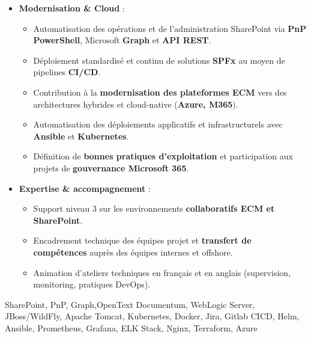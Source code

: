 \begin{experiences}
{\begin{itemize}[left=0pt,label={},itemsep=0.5em]
\begin{itemize}[itemsep=0.2em,topsep=0.2em,parsep=0pt]
            \end{itemize}
            \vspace{0.1em}
          \item \textbf{Modernisation \& Cloud} :
            \begin{itemize}[itemsep=0.25em,topsep=0.2em,parsep=0pt]
              \small
              \item Automatisation des opérations et de l’administration SharePoint via \textbf{PnP PowerShell}, Microsoft \textbf{Graph} et \textbf{API REST}.
              \item Déploiement standardisé et continu de solutions \textbf{SPFx} au moyen de pipelines \textbf{CI/CD}.
              \item Contribution à la \textbf{modernisation des plateformes ECM} vers des architectures hybrides et cloud-native (\textbf{Azure, M365}).
              \item Automatisation des déploiements applicatifs et infrastructurels avec \textbf{Ansible} et \textbf{Kubernetes}.
              \item Définition de \textbf{bonnes pratiques d’exploitation} et participation aux projets de \textbf{gouvernance Microsoft 365}.
            \end{itemize}
            \vspace{0.1em}

          \item \textbf{Expertise \& accompagnement} :
            \begin{itemize}[itemsep=0.2em,topsep=0.2em,parsep=0pt]
              \small
              \item Support niveau 3 sur les environnements \textbf{collaboratifs ECM et SharePoint}.
              \item Encadrement technique des équipes projet et \textbf{transfert de compétences} auprès des équipes internes et offshore.
              \item Animation d’ateliers techniques en français et en anglais (supervision, monitoring, pratiques DevOps).
            \end{itemize}
        \end{itemize}
        \vspace{0.3em}
    }
    {SharePoint, PnP, Graph,OpenText Documentum, WebLogic Server, JBoss/WildFly, Apache Tomcat, Kubernetes, Docker, Jira, Gitlab CICD, Helm, Ansible, Prometheus, Grafana, ELK Stack, Nginx, Terraform, Azure}
    
\emptySeparator
\emptySeparator


\end{experiences}
